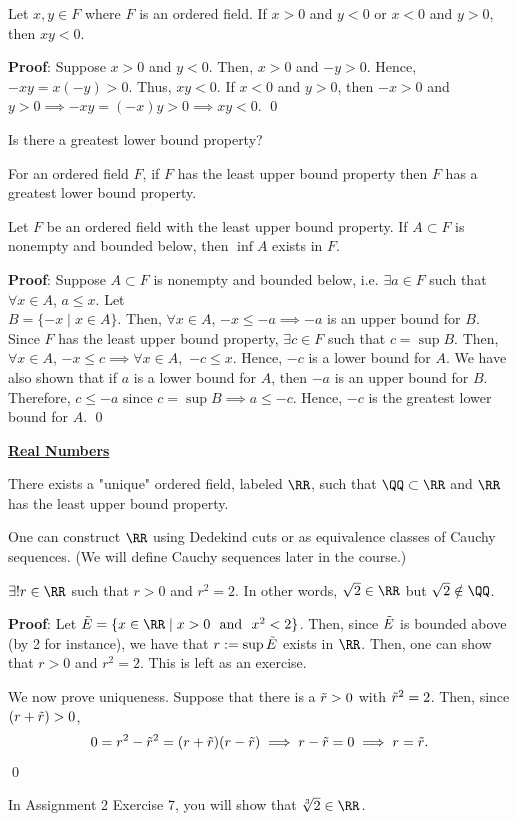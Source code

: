\begin{theorem}
Let $x,y\in F$ where $F$ is an ordered field. If $x>0$ and $y<0$ or $x<0$ and $y>0$, then $xy<0$.
\end{theorem}
\textbf{Proof}: Suppose $x>0$ and $y<0$. Then, $x>0$ and $-y>0$. Hence, $-xy = x(-y)>0$. Thus, $xy<0$. If $x<0$ and $y>0$, then $-x>0$ and $y>0\implies -xy = (-x)y>0 \implies xy<0.$ \qed

\begin{question}
Is there a greatest lower bound property? %
\end{question}
For an ordered field $F$, if $F$ has the least upper bound  property then $F$ has a greatest lower bound property.

\begin{theorem}
Let $F$ be an ordered field with the least upper bound property. If $A\subset F$ is nonempty and bounded below, then $\inf A$ exists in $F$.
\end{theorem}
\textbf{Proof}: Suppose $A\subset F$ is nonempty and bounded below, i.e. $\exists a\in F$ such that $\forall x\in A$, $a\leq x$. Let\\ $B = \{-x\mid x\in A\}$. Then, $\forall x\in A$, $-x\leq -a\implies -a$ is an upper bound for $B$. Since $F$ has the least upper bound property, $\exists c\in F$ such that $c = \sup B$. Then, $\forall x\in A$, $-x\leq c\implies \forall x\in A,$ $-c\leq x$. Hence, $-c$ is a lower bound for $A$. We have also shown that if $a$ is a lower bound for $A$, then $-a$ is an upper bound for $B$. Therefore, $c\leq -a$ since $c=\sup B\implies a\leq -c$. Hence, $-c$ is the greatest lower bound for $A$.
\qed 

\noindent \underline{\textbf{Real Numbers}}

\begin{theorem}
There exists a "unique" ordered field, labeled $\RR$, such that $\QQ\subset \RR$ and $\RR$ has the least upper bound property.
\end{theorem}
One can construct $\RR$ using Dedekind cuts or as equivalence classes of Cauchy sequences. (We will define Cauchy sequences later in the course.)

\begin{theorem}
$\exists! r\in \RR$ such that $r>0$ and $r^2 =2$. In other words, $\sqrt 2 \in \RR$ but $\sqrt 2 \notin \QQ$.
\end{theorem}
\textbf{Proof}: Let $\Tilde{E} = \{x\in \RR \mid x>0 \text{~~and~~} x^2<2\}$. Then, since $\Tilde{E}$ is bounded above (by 2 for instance), we have that $r:= \sup\Tilde{E}$ exists in $\RR$. Then, one can show that $r>0$ and $r^2 = 2$. This is left as an exercise.

We now prove uniqueness. Suppose that there is a $\Tilde{r}>0$ with $\Tilde{r}^2 = 2$. Then, since $(r+\Tilde{r})>0$,
\[
0 = r^2 -\Tilde{r}^2 = (r+\Tilde{r})(r-\Tilde{r}) \implies r-\tilde r = 0 \implies r = \Tilde{r}.
\] 
\qed 

\begin{remark}
In Assignment 2 Exercise 7, you will show that $\sqrt[3]2\in \RR$.
\end{remark}